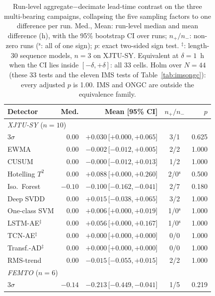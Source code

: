 \begin{table}[t] \small
	\begin{center}
	\caption{Run-level aggregate$-$decimate lead-time contrast on the three multi-bearing campaigns, collapsing the five sampling factors to one difference per run. Med., Mean: run-level median and mean difference (h), with the 95\% bootstrap CI over runs; $n_+/n_-$: non-zero runs ($^{\mathrm{s}}$: all of one sign); $p$: exact two-sided sign test. $^\ddagger$: length-30 sequence models, $n=3$ on XJTU-SY. Equivalent at $\delta=1$~h when the CI lies inside $[-\delta,+\delta]$: all 33 cells. Holm over $N=44$ (these 33 tests and the eleven IMS tests of Table~\ref{tab:imsongc}): every adjusted $p$ is 1.00. IMS and ONGC are outside the equivalence family.}
	\label{tab:crossds}
	\setlength{\tabcolsep}{1.5pt}
	\begin{tabular}{l r r c r}
		\hline \hline
		\textbf{Detector} & \textbf{Med.} & \textbf{Mean [95\% CI]} & $n_+/n_-$ & $p$ \\
		\hline
		\multicolumn{5}{l}{\emph{XJTU-SY} ($n=10$)} \\
		$3\sigma$ & 0.00 & $+0.030$\,[$+0.000$,\,$+0.065$] & 3/1 & 0.625 \\
		EWMA & 0.00 & $-0.002$\,[$-0.012$,\,$+0.005$] & 2/2 & 1.000 \\
		CUSUM & 0.00 & $-0.000$\,[$-0.012$,\,$+0.013$] & 1/2 & 1.000 \\
		Hotelling $T^2$ & 0.00 & $+0.088$\,[$+0.000$,\,$+0.260$] & 2/0$^{\mathrm{s}}$ & 0.500 \\
		Iso.\ Forest & $-0.10$ & $-0.100$\,[$-0.162$,\,$-0.041$] & 2/7 & 0.180 \\
		Deep SVDD & 0.00 & $+0.015$\,[$-0.038$,\,$+0.065$] & 3/2 & 1.000 \\
		One-class SVM & 0.00 & $+0.006$\,[$+0.000$,\,$+0.019$] & 1/0$^{\mathrm{s}}$ & 1.000 \\
		LSTM-AE$^\ddagger$ & 0.00 & $+0.056$\,[$+0.000$,\,$+0.167$] & 1/0$^{\mathrm{s}}$ & 1.000 \\
		TCN-AE$^\ddagger$ & 0.00 & $+0.000$\,[$+0.000$,\,$+0.000$] & 0/0 & 1.000 \\
		Transf.-AD$^\ddagger$ & 0.00 & $+0.000$\,[$+0.000$,\,$+0.000$] & 0/0 & 1.000 \\
		RMS-trend & 0.00 & $-0.015$\,[$-0.055$,\,$+0.015$] & 2/2 & 1.000 \\
		\hline
		\multicolumn{5}{l}{\emph{FEMTO} ($n=6$)} \\
		$3\sigma$ & $-0.14$ & $-0.213$\,[$-0.449$,\,$-0.041$] & 1/5 & 0.219 \\

\end{tabular}
\end{center}
\end{table}
